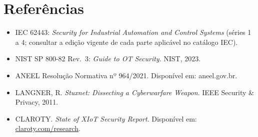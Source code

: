 \section{Referências}\label{referuxeancias}

\begin{itemize}
\tightlist
\item
  IEC 62443: \emph{Security for Industrial Automation and Control Systems} (séries 1 a 4; consultar a edição vigente de cada parte aplicável no catálogo IEC).
\item
  NIST SP 800-82 Rev.~3: \emph{Guide to OT Security}. NIST, 2023.
\item
  ANEEL Resolução Normativa nº 964/2021. Disponível em: aneel.gov.br.
\item
  LANGNER, R. \emph{Stuxnet: Dissecting a Cyberwarfare Weapon}. IEEE Security \& Privacy, 2011.
\item
  CLAROTY. \emph{State of XIoT Security Report}. Disponível em: \url{claroty.com/research}.
\end{itemize}
